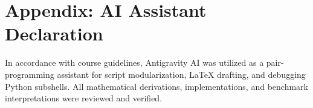 \documentclass[conference]{IEEEtran}
\begin{document}
\section*{Appendix: AI Assistant Declaration}
In accordance with course guidelines, Antigravity AI was utilized as a pair-programming assistant for script modularization, LaTeX drafting, and debugging Python subshells. All mathematical derivations, implementations, and benchmark interpretations were reviewed and verified.



\end{document}
